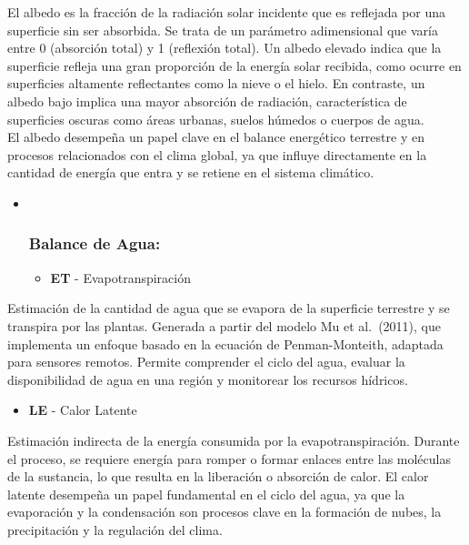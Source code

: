 \documentclass[
]{book}
\providecommand{\tightlist}{%
  \setlength{\itemsep}{0pt}\setlength{\parskip}{0pt}}
\begin{document}
El albedo es la fracción de la radiación solar incidente que es reflejada por una superficie sin ser absorbida. Se trata de un parámetro adimensional que varía entre 0 (absorción total) y 1 (reflexión total). Un albedo elevado indica que la superficie refleja una gran proporción de la energía solar recibida, como ocurre en superficies altamente reflectantes como la nieve o el hielo. En contraste, un albedo bajo implica una mayor absorción de radiación, característica de superficies oscuras como áreas urbanas, suelos húmedos o cuerpos de agua.\\
El albedo desempeña un papel clave en el balance energético terrestre y en procesos relacionados con el clima global, ya que influye directamente en la cantidad de energía que entra y se retiene en el sistema climático.

\begin{itemize}
\item ~
  \subsubsection{\texorpdfstring{\textbf{Balance de Agua:}}{Balance de Agua:}}\label{balance-de-agua}

  \begin{itemize}
  \tightlist
  \item
    \textbf{ET} - Evapotranspiración
  \end{itemize}
\end{itemize}

Estimación de la cantidad de agua que se evapora de la superficie terrestre y se transpira por las plantas. Generada a partir del modelo Mu et al.~(2011), que implementa un enfoque basado en la ecuación de Penman-Monteith, adaptada para sensores remotos. Permite comprender el ciclo del agua, evaluar la disponibilidad de agua en una región y monitorear los recursos hídricos.

\begin{itemize}
\tightlist
\item
  \textbf{LE} - Calor Latente
\end{itemize}

Estimación indirecta de la energía consumida por la evapotranspiración. Durante el proceso, se requiere energía para romper o formar enlaces entre las moléculas de la sustancia, lo que resulta en la liberación o absorción de calor. El calor latente desempeña un papel fundamental en el ciclo del agua, ya que la evaporación y la condensación son procesos clave en la formación de nubes, la precipitación y la regulación del clima.
\end{document}

